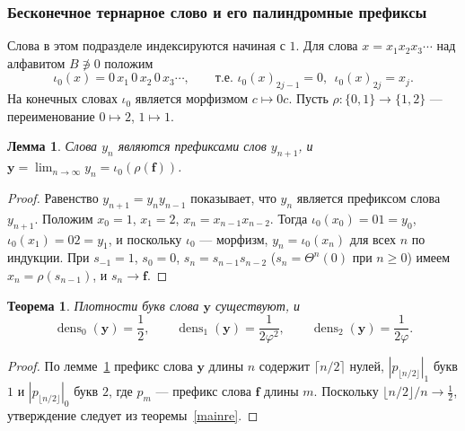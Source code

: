 \documentclass[a4paper,14pt]{extreport}
\theoremstyle{plain}
\newtheorem{theorem}{Теорема}[section]
\newtheorem{lemma}{Лемма}[section]
\theoremstyle{definition}
\theoremstyle{remark}
\begin{document}
\subsubsection{Бесконечное тернарное слово и его палиндромные префиксы}\label{sec:Yinf}

Слова в этом подразделе индексируются начиная с $1$. Для слова $x=x_1x_2x_3\cdots$ над
алфавитом $B\not\ni 0$ положим
\begin{equation}
	\iota_0(x)=0\,x_1\,0\,x_2\,0\,x_3\cdots,\qquad\text{т.е. } \iota_0(x)_{2j-1}=0,\ \ \iota_0(x)_{2j}=x_j .
\end{equation}
На конечных словах $\iota_0$ является морфизмом $c\mapsto 0c$. Пусть $\rho:\{0,1\}\to\{1,2\}$ ---
переименование $0\mapsto 2$, $1\mapsto1$.

\begin{lemma}\label{lem:Ystructure}
	Слова $y_n$ являются префиксами слов $y_{n+1}$, и $\mathbf y=\lim_{n\to\infty}y_n=\iota_0(\rho(\mathbf f))$.
\end{lemma}
\begin{proof}
	Равенство $y_{n+1}=y_ny_{n-1}$ показывает, что $y_n$ является префиксом слова $y_{n+1}$. Положим $x_0=1$, $x_1=2$,
	$x_n=x_{n-1}x_{n-2}$. Тогда $\iota_0(x_0)=01=y_0$, $\iota_0(x_1)=02=y_1$, и поскольку $\iota_0$ --- морфизм,
	$y_n=\iota_0(x_n)$ для всех $n$ по индукции. При $s_{-1}=1$, $s_0=0$, $s_n=s_{n-1}s_{n-2}$
	($s_n=\Theta^n(0)$ при $n\ge0$) имеем $x_n=\rho(s_{n-1})$, и $s_{n}\to\mathbf f$.
\end{proof}

\begin{theorem}\label{thm:Yinf}
	Плотности букв слова $\mathbf y$ существуют, и
	\begin{equation}
		\operatorname{dens}_0(\mathbf y)=\frac12,\qquad
		\operatorname{dens}_1(\mathbf y)=\frac1{2\varphi^{2}},\qquad
		\operatorname{dens}_2(\mathbf y)=\frac1{2\varphi}.
	\end{equation}
\end{theorem}
\begin{proof}
	По лемме~\ref{lem:Ystructure} префикс слова $\mathbf y$ длины $n$ содержит $\lceil n/2\rceil$ нулей,
	$|p_{\lfloor n/2\rfloor}|_1$ букв $1$ и $|p_{\lfloor n/2\rfloor}|_0$ букв $2$, где
	$p_m$ --- префикс слова $\mathbf f$ длины $m$. Поскольку $\lfloor n/2\rfloor/n\to\frac12$, утверждение следует
	из теоремы~\ref{mainre}.
\end{proof}
\end{document}
